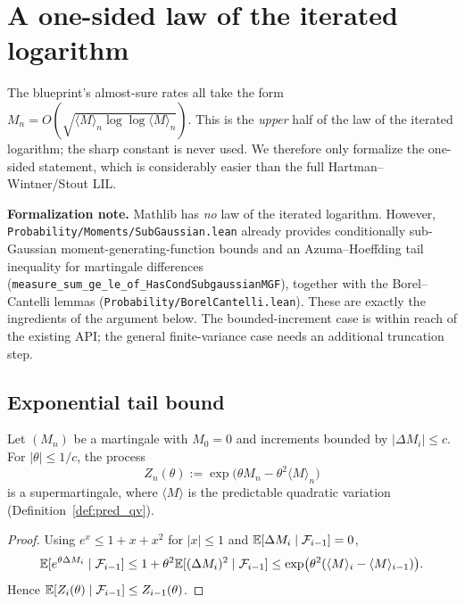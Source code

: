 \chapter{A one-sided law of the iterated logarithm}
\label{chap:pre_lil}

The blueprint's almost-sure rates all take the form
$M_n = O(\sqrt{\langle M\rangle_n \log\log\langle M\rangle_n})$. This is the
\emph{upper} half of the law of the iterated logarithm; the sharp constant is
never used. We therefore only formalize the one-sided statement, which is
considerably easier than the full Hartman--Wintner/Stout LIL.

\textbf{Formalization note.} Mathlib has \emph{no} law of the iterated logarithm.
However, \texttt{Probability/Moments/SubGaussian.lean} already provides
conditionally sub-Gaussian moment-generating-function bounds and an
Azuma--Hoeffding tail inequality for martingale differences
(\texttt{measure\_sum\_ge\_le\_of\_HasCondSubgaussianMGF}), together with the
Borel--Cantelli lemmas (\texttt{Probability/BorelCantelli.lean}). These are
exactly the ingredients of the argument below. The bounded-increment case is
within reach of the existing API; the general finite-variance case needs an
additional truncation step.

\section{Exponential tail bound}
\label{sec:pre_lil_tail}

\begin{lemma}\label{lem:lil_exp_supermart}
\leanok
Let $(M_n)$ be a martingale with $M_0=0$ and increments bounded by
$|\Delta M_i| \le c$. For $|\theta| \le 1/c$, the process
\[
  Z_n(\theta) := \exp\!\Big(\theta M_n - \theta^2 \langle M\rangle_n\Big)
\]
is a supermartingale, where $\langle M\rangle$ is the predictable quadratic
variation (Definition~\ref{def:pred_qv}).
\end{lemma}

\begin{proof}\leanok
{}
Using $e^x \le 1 + x + x^2$ for $|x| \le 1$ and $\mathbb{E}[\Delta M_i\mid\mathcal{F}_{i-1}]=0$,
\[
  \mathbb{E}[e^{\theta\Delta M_i}\mid\mathcal{F}_{i-1}]
  \le 1 + \theta^2\mathbb{E}[(\Delta M_i)^2\mid\mathcal{F}_{i-1}]
  \le \exp\!\big(\theta^2(\langle M\rangle_i - \langle M\rangle_{i-1})\big).
\]
Hence $\mathbb{E}[Z_i(\theta)\mid\mathcal{F}_{i-1}] \le Z_{i-1}(\theta)$.
\end{proof}

